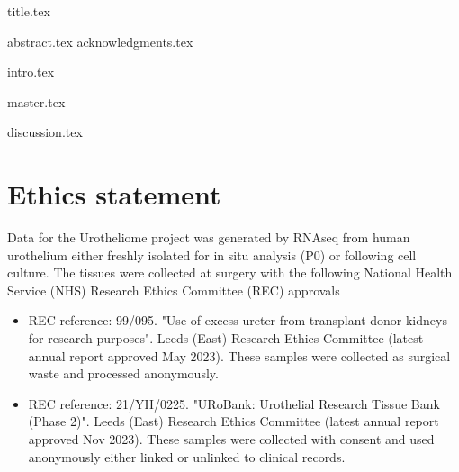 \documentclass[a4paper, 12pt]{report}
\begin{document}
{title.tex}



\setcounter{tocdepth}{4}





{abstract.tex}
{acknowledgments.tex}

\tableofcontents
\newpage

\listoffigures
\newpage

\listoftables
\newpage
\printglossary[type=acronym]
\newpage





{intro.tex}
\newpage

{master.tex}

{discussion.tex}


\chapter{Ethics statement}

Data for the Urotheliome project was generated by RNAseq from human urothelium either freshly isolated for in situ analysis (P0) or following cell culture. The tissues were collected at surgery with the following National Health Service (NHS) Research Ethics Committee (REC) approvals

\begin{itemize}
    \item REC reference: 99/095. "Use of excess ureter from transplant donor kidneys for research purposes". Leeds (East) Research Ethics Committee (latest annual report approved May 2023). These samples were collected as surgical waste and processed anonymously.
    \item REC reference: 21/YH/0225. "URoBank: Urothelial Research Tissue Bank (Phase 2)". Leeds (East) Research Ethics Committee (latest annual report approved Nov 2023). These samples were collected with consent and used anonymously either linked or unlinked to clinical records.  
\end{itemize}
\end{document}
